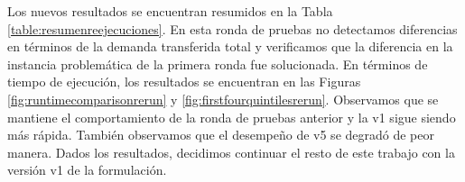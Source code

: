 Los nuevos resultados se encuentran resumidos en la Tabla \ref{table:resumenreejecuciones}. En esta ronda de pruebas no detectamos diferencias en términos de la demanda transferida total y verificamos que la diferencia en la instancia problemática de la primera ronda fue solucionada. En términos de tiempo de ejecución, los resultados se encuentran en las Figuras \ref{fig:runtimecomparisonrerun} y \ref{fig:firstfourquintilesrerun}. Observamos que se mantiene el comportamiento de la ronda de pruebas anterior y la v1 sigue siendo más rápida. También observamos que el desempeño de v5 se degradó de peor manera. Dados los resultados, decidimos continuar el resto de este trabajo con la versión v1 de la formulación.
